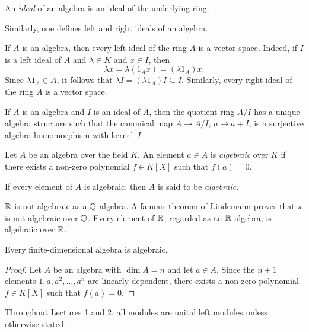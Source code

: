 \begin{definition}
 	An \emph{ideal} of an algebra is an ideal of the underlying ring.
\end{definition}

Similarly, one defines left and right ideals of an algebra.

If $A$ is an algebra, then every left ideal of the ring $A$ is a vector space.  
Indeed, if $I$ is a left ideal of $A$ 
and $\lambda\in K$ and $x\in I$, then 
\[
	\lambda x=\lambda (1_Ax)=(\lambda 1_A)x.
\]
Since $\lambda 1_A\in A$, it follows that  $\lambda I=(\lambda
1_A)I\subseteq I$. 
Similarly, every right ideal of the ring $A$ is a vector space. 

If $A$ is an algebra and $I$ is an ideal of $A$, then the quotient ring $A/I$ has a unique algebra
structure such that the canonical map  
$A\to A/I$, $a\mapsto a+I$, is a surjective algebra homomorphism with kernel~$I$. 

\begin{definition}
    Let $A$ be an algebra over the field $K$. An element $a\in A$ is 
    \emph{algebraic} over $K$ if there exists a non-zero polynomial $f\in K[X]$
    such that $f(a)=0$. 
\end{definition}

If every element of $A$ is algebraic, then $A$ is said to be \emph{algebraic}. 

$\mathbb{R}$ is not algebraic as a $\mathbb{Q}$-algebra. 
A famous theorem of Lindemann proves that $\pi$ is not algebraic over $\mathbb{Q}$.
Every element of $\mathbb{R}$, regarded as an $\mathbb{R}$-algebra, is algebraic over $\mathbb{R}$.

\begin{proposition}
	\label{pro:algebraic}
	Every finite-dimensional algebra is algebraic.
\end{proposition}

\begin{proof}
  Let $A$ be an algebra with $\dim A=n$ and let $a\in A$. Since the 
  $n+1$ elements 
	$1,a,a^2,\dots,a^n$ are linearly dependent, 
  there exists 
	a non-zero polynomial $f\in K[X]$ such that $f(a)=0$.
\end{proof}

Throughout Lectures 1 and 2, all modules are unital left modules unless
otherwise stated.

